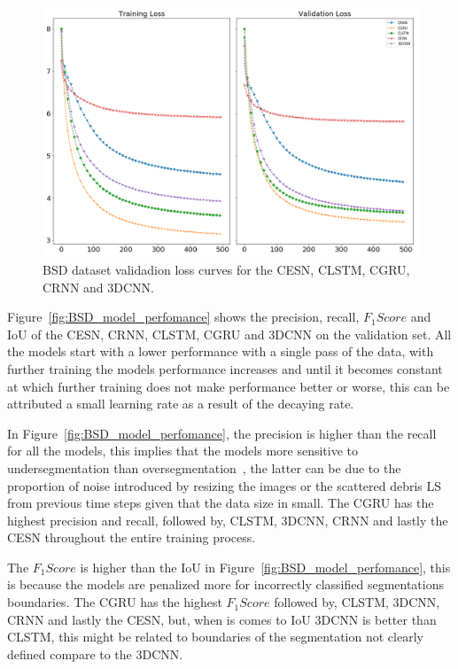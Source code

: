 \documentclass{WitsPhysicsReport}
\begin{document}
\begin{figure}[H]
\centering
  \includegraphics[width=1\textwidth]{Figure/Results/BSR_loss.png}
\caption{BSD dataset validadion loss curves for the CESN, CLSTM, CGRU, CRNN and 3DCNN.} \label{fig:BSD_model_loss}
\end{figure}

Figure~\ref{fig:BSD_model_perfomance} shows the precision, recall, $F_{1}Score$ and IoU of the CESN, CRNN, CLSTM, CGRU and 3DCNN on the validation set. All the models start with a lower performance with a single pass of the data, with further training the models performance increases and until it becomes constant at which further training does not make performance better or worse, this can be attributed a small learning rate as a result of the decaying rate.

In Figure~\ref{fig:BSD_model_perfomance}, the precision is higher than the recall for all the models, this implies that the models more sensitive to undersegmentation than oversegmentation~\cite{sigut2015over, troya2015unsupervised}, the latter can be due to the proportion of noise introduced by resizing the images or the scattered debris LS from previous time steps given that the data size in small. The CGRU has the highest precision and recall, followed by, CLSTM, 3DCNN, CRNN and lastly the CESN throughout the entire training process.

The $F_{1}Score$ is higher than the IoU in Figure~\ref{fig:BSD_model_perfomance}, this is because the models are penalized more for incorrectly classified segmentations boundaries. The CGRU has the highest $F_{1}Score$ followed by, CLSTM, 3DCNN, CRNN and lastly the CESN, but, when is comes to IoU 3DCNN is better than CLSTM, this might be related to boundaries of the segmentation not clearly defined compare to the 3DCNN. 
\end{document}
